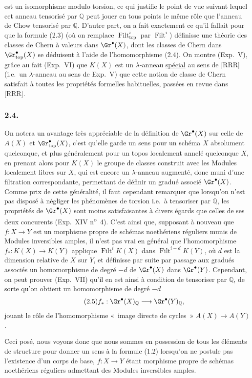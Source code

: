 est un
isomorphisme modulo torsion, ce qui justifie le point de vue suivant lequel cet anneau tensorisé par $\mathbb Q$ peut jouer en tous points le même rôle que l'anneau de Chow tensorisé par $\mathbb Q$. D'autre part, on a fait exactement ce qu'il fallait pour que la formule (2.3) (où on remplace $\operatorname{Filt}^i_{\mathrm{top}}$ par $\operatorname{Filt}^i$) définisse une théorie des classes de Chern à valeurs dans $\Gr^\bullet(X)$, dont les classes de Chern dans $\Gr^{\bullet}_{\mathrm{top}}(X)$ se déduisent à l'aide de l'homomorphisme (2.4). On montre (Exp.\ V), grâce au fait (Exp.\ VI) que $K(X)$ est un $\lambda$-anneau \underline{spécial} au sens de [RRR] (i.e.\ un $\lambda$-anneau au sens de Exp.\ V) que cette notion de classe de Chern satisfait à toutes les propriétés formelles habituelles, passées en revue dans [RRR].

\subsubsection*{2.4.}
On notera un avantage très appréciable de la définition de $\Gr^\bullet(X)$ sur celle de $A(X)$ et $\Gr^{\bullet}_{\mathrm{top}}(X)$, c'est qu'elle garde un sens pour un schéma $X$ absolument quelconque, et plus généralement pour un topos localement annelé quelconque $X$, en prenant alors pour $K(X)$ le groupe de classes construit avec les Modules localement libres sur $X$, qui est encore un $\lambda$-anneau augmenté, donc muni d'une filtration correspondante, permettant de définir un gradué associé $\Gr^\bullet(X)$. Comme prix de cette généralité, il faut cependant remarquer que lorsqu'on n'est pas disposé à négliger les phénomènes de torsion i.e.\ à tensoriser par $\mathbb Q$, les propriétés de $\Gr^\bullet(X)$ sont moins satisfaisantes à divers égards que celles de ses deux concurents (Exp.\ XIV n\textsuperscript{o}~4). C'est ainsi que, supposant à nouveau que $f:X\to Y$ est un morphisme propre de schémas noethériens réguliers munis de Modules inversibles amples, il n'est pas vrai en général que l'homomorphisme $f_*:K(X)\longrightarrow K(Y)$ applique $\operatorname{Filt}^i K(X)$ dans $\operatorname{Filt}^{i-d} K(Y)$, où $d$ est la dimension relative de $X$ sur $Y$, et définisse par suite par passage aux gradués associés un homomorphisme de degré $-d$ de $\Gr^\bullet(X)$ dans $\Gr^\bullet(Y)$. Cependant, on peut prouver (Exp.\ VII) qu'il en est ainsi à condition de tensoriser par $\mathbb Q$, de sorte qu'on obtient un homomorphisme de degré $-d$
\begin{equation}\tag{2.5}
f_*:\Gr^\bullet(X)_{\mathbb Q}\longrightarrow \Gr^\bullet(Y)_{\mathbb Q},
\end{equation}
jouant le rôle de l'homomorphisme «~image directe de cycles~» $A(X)\to A(Y)$.

Ceci posé, nous voyons donc que nous sommes en possession de tous les éléments de structure pour donner un sens à la formule (1.2) lorsqu'on ne postule pas l'existence d'un corps de base, $f:X\to Y$ étant morphisme propre de schémas noethériens réguliers admettant des Modules inversibles amples.

